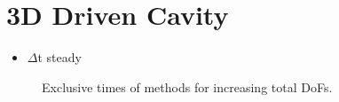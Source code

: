 \documentclass{article}
\begin{document}
\section*{3D Driven Cavity}
\begin{itemize}
	\large
	\item $\Delta$t steady
\end{itemize}
	\begin{figure}
		\hspace{-4.5cm}
		\rule{0cm}{1.1cm}
		\caption{Exclusive times of methods for increasing total DoFs.}
	\end{figure}
\end{document}
